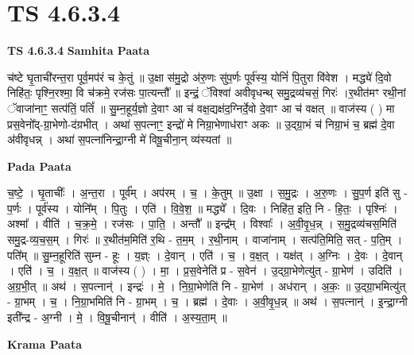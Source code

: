 \documentclass[17pt]{extarticle}
\begin{document}
\section{ TS 4.6.3.4 }

\textbf{TS 4.6.3.4 } \newline
\textbf{Samhita Paata} \newline

च॑ष्टे घृ॒ताची॑रन्त॒रा पूर्व॒मप॑रं च के॒तुं ॥ उ॒क्षा स॑मु॒द्रो अ॑रु॒णः सु॑प॒र्णः पूर्व॑स्य॒ योनिं॑ पि॒तुरा वि॑वेश । मद्ध्ये॑ दि॒वो निहि॑तः॒ पृश्नि॒रश्मा॒ वि च॑क्रमे॒ रज॑सः पा॒त्यन्तौ᳚ ॥ इन्द्रं॒ ॅविश्वा॑ अवीवृधन्थ् समु॒द्रव्य॑चसं॒ गिरः॑ ।र॒थीत॑मꣳ रथी॒नां ॅवाजा॑नाꣳ॒॒ सत्प॑तिं॒ पतिं᳚ ॥ सु॒म्न॒हूर्य॒ज्ञो दे॒वाꣳ आ च॑ वक्ष॒द्यक्ष॑द॒ग्निर्दे॒वो दे॒वाꣳ आ च॑ वक्षत् ॥ वाज॑स्य ( ) मा प्रस॒वेनो᳚द्-ग्रा॒भेणो-द॑ग्रभीत् । अथा॑ स॒पत्नाꣳ॒॒ इन्द्रो॑ मे निग्रा॒भेणाध॑राꣳ अकः ॥ उ॒द्ग्रा॒भं च॑ निग्रा॒भं च॒ ब्रह्म॑ दे॒वा अ॑वीवृधन्न् । अथा॑ स॒पत्ना॑निन्द्रा॒ग्नी मे॑ विषू॒चीना॒न् व्य॑स्यतां ॥ \newline

\textbf{Pada Paata} \newline

च॒ष्टे॒ । घृ॒ताचीः᳚ । अ॒न्त॒रा । पूर्व᳚म् । अप॑रम् । च॒ । के॒तुम् ॥ उ॒क्षा । स॒मु॒द्रः । अ॒रु॒णः । सु॒प॒र्ण इति॑ सु - प॒र्णः । पूर्व॑स्य । योनि᳚म् । पि॒तुः । एति॑ । वि॒वे॒श॒ ॥ मद्ध्ये᳚ । दि॒वः । निहि॑त॒ इति॒ नि - हि॒तः॒ । पृश्निः॑ । अश्मा᳚ । वीति॑ । च॒क्र॒मे॒ । रज॑सः । पा॒ति॒ । अन्तौ᳚ ॥ इन्द्र᳚म् । विश्वाः᳚ । अ॒वी॒वृ॒ध॒न्न् । स॒मु॒द्रव्य॑चस॒मिति॑ समु॒द्र-व्य॒च॒स॒म् । गिरः॑ ॥ र॒थीत॑म॒मिति॑ र॒थि - त॒म॒म् । र॒थी॒नाम् । वाजा॑नाम् । सत्प॑ति॒मिति॒ सत् - प॒ति॒म् । पति᳚म् ॥ सु॒म्न॒हूरिति॑ सुम्न - हूः । य॒ज्ञ्ः । दे॒वान् । एति॑ । च॒ । व॒क्ष॒त् । यक्ष॑त् । अ॒ग्निः । दे॒वः । दे॒वान् । एति॑ । च॒ । व॒क्ष॒त् ॥ वाज॑स्य ( ) । मा॒ । प्र॒स॒वेनेति॑ प्र - स॒वेन॑ । उ॒द्ग्रा॒भेणेत्यु॑त् - ग्रा॒भेण॑ । उदिति॑ । अ॒ग्र॒भी॒त् ॥ अथ॑ । स॒पत्नान्॑ । इन्द्रः॑ । मे॒ । नि॒ग्रा॒भेणेति॑ नि - ग्रा॒भेण॑ । अध॑रान् । अ॒कः॒ ॥ उ॒द्ग्रा॒भमित्यु॑त् - ग्रा॒भम् । च॒ । नि॒ग्रा॒भमिति॑ नि - ग्रा॒भम् । च॒ । ब्रह्म॑ । दे॒वाः । अ॒वी॒वृ॒ध॒न्न् ॥ अथ॑ । स॒पत्नान्॑ । इ॒न्द्रा॒ग्नी इती᳚न्द्र - अ॒ग्नी । मे॒ । वि॒षू॒चीनान्॑ । वीति॑ । अ॒स्य॒ता॒म् ॥  \newline


\textbf{Krama Paata} \newline
\end{document}
